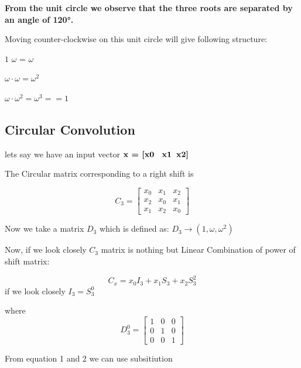 \documentclass{article}
\begin{document}
\textbf{From the unit circle we observe that the three roots are separated by an angle of 120°.}
\begin{center}
\end{center}

Moving counter-clockwise on this unit circle will give following structure:

$1$ \cdot $\omega$ = $\omega$

$\omega \cdot \omega = \omega^2$

$\omega \cdot \omega^2 = \omega^3 == 1$


\subsection{Circular Convolution}
lets say we have an input vector $\textbf{x = [x0 \, x1 \,x2]}$

The Circular matrix corresponding to a right shift is

\[C_3  = \begin{bmatrix}
    x_0 &  x_1 & x_2 \\ x_2 & x_0 & x_1 \\ x_1 & x_2 & x_0
\end{bmatrix}\]

Now we take a matrix $D_3$ which is defined as: $D_3 \xrightarrow{} (1,\omega,\omega^2)$

Now, if we look closely $C_3$ matrix is nothing but Linear Combination of power of shift matrix:

\begin{equation}
C_x = x_0I_3 + x_1S_3 + x_2S_3^2
\label{eq:C_x}
\end{equation}
if we look closely $I_3 = S_3^0$

where 
\[D_3^0 = \begin{bmatrix}
    1 & 0 & 0 \\ 0 & 1 & 0 \\  0 & 0 & 1
\end{bmatrix}\]

From equation 1 and 2 we can use subsitiution
\end{document}
